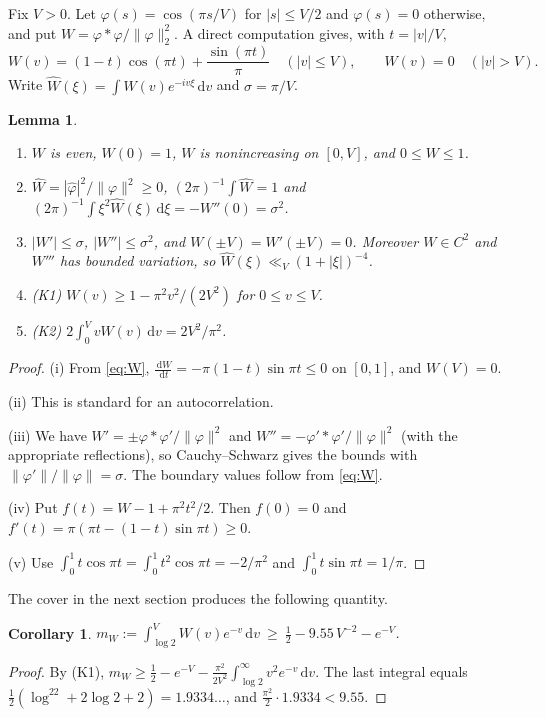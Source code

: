 \documentclass[11pt]{amsart}
\newtheorem{lemma}[theorem]{Lemma}
\newtheorem{corollary}[theorem]{Corollary}
\theoremstyle{remark}
\newcommand{\dd}{\,\mathrm{d}}
\newcommand{\Wh}{\widehat W}
\begin{document}
Fix $V>0$. Let $\varphi(s)=\cos(\pi s/V)$ for $|s|\le V/2$ and $\varphi(s)=0$ otherwise, and put $W=\varphi*\varphi/\|\varphi\|_2^2$. A direct computation gives, with $t=|v|/V$,
\begin{equation}\label{eq:W}
W(v)=(1-t)\cos(\pi t)+\frac{\sin(\pi t)}{\pi}\quad(|v|\le V),\qquad W(v)=0\quad(|v|>V).
\end{equation}
Write $\Wh(\xi)=\int W(v)e^{-iv\xi}\dd v$ and $\sigma=\pi/V$.

\begin{lemma}\label{lem:kernel}
\begin{enumerate}
\item[(i)] $W$ is even, $W(0)=1$, $W$ is nonincreasing on $[0,V]$, and $0\le W\le1$.
\item[(ii)] $\Wh=|\widehat\varphi|^2/\|\varphi\|^2\ge0$, $(2\pi)^{-1}\int\Wh=1$ and $(2\pi)^{-1}\int\xi^2\Wh(\xi)\dd\xi=-W''(0)=\sigma^2$.
\item[(iii)] $|W'|\le\sigma$, $|W''|\le\sigma^2$, and $W(\pm V)=W'(\pm V)=0$. Moreover $W\in C^2$ and $W'''$ has bounded variation, so $\Wh(\xi)\ll_V(1+|\xi|)^{-4}$.
\item[(iv)] \textup{(K1)} $W(v)\ge1-\pi^2v^2/(2V^2)$ for $0\le v\le V$.
\item[(v)] \textup{(K2)} $2\int_0^VvW(v)\dd v=2V^2/\pi^2$.
\end{enumerate}
\end{lemma}

\begin{proof}
(i) From \eqref{eq:W}, $\frac{\dd W}{\dd t}=-\pi(1-t)\sin\pi t\le0$ on $[0,1]$, and $W(V)=0$.

(ii) This is standard for an autocorrelation.

(iii) We have $W'=\pm\varphi*\varphi'/\|\varphi\|^2$ and $W''=-\varphi'*\varphi'/\|\varphi\|^2$ (with the appropriate reflections), so Cauchy--Schwarz gives the bounds with $\|\varphi'\|/\|\varphi\|=\sigma$. The boundary values follow from \eqref{eq:W}.

(iv) Put $f(t)=W-1+\pi^2t^2/2$. Then $f(0)=0$ and $f'(t)=\pi(\pi t-(1-t)\sin\pi t)\ge0$.

(v) Use $\int_0^1t\cos\pi t=\int_0^1t^2\cos\pi t=-2/\pi^2$ and $\int_0^1t\sin\pi t=1/\pi$.
\end{proof}

The cover in the next section produces the following quantity.

\begin{corollary}\label{cor:m}
$m_W:=\int_{\log2}^{V}W(v)e^{-v}\dd v\ \ge\ \tfrac12-9.55\,V^{-2}-e^{-V}$.
\end{corollary}
\begin{proof}
By (K1), $m_W\ge\tfrac12-e^{-V}-\frac{\pi^2}{2V^2}\int_{\log2}^\infty v^2e^{-v}\dd v$. The last integral equals $\frac12(\log^22+2\log2+2)=1.9334\ldots$, and $\frac{\pi^2}{2}\cdot1.9334<9.55$.
\end{proof}
\end{document}
